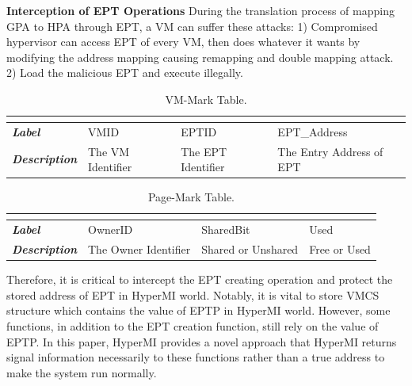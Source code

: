 \documentclass[conference]{IEEEtran}
\begin{document}
\textbf{Interception of EPT Operations }
During the translation process of mapping GPA to HPA through EPT, a VM can suffer these attacks: 1) Compromised hypervisor can access EPT of every VM, then does whatever it wants by modifying the address mapping causing remapping and double mapping attack. 2) Load the malicious EPT and execute illegally.
\begin{table}[htbp]
\centering
\caption{VM-Mark Table.}\label{tab1}
\begin{tabular}{p{1.4cm}|p{1.2cm}|p{1.1cm}|p{1.7cm}}
\hline
\multicolumn{4}{c}{\bfseries\textbf\centering{VM-Mark Table}}\\
\hline
{\itshape\bfseries Label} & VMID & EPTID & EPT\_Address\\
\hline
{\itshape\bfseries Description} & { The VM Identifier} & The EPT Identifier & The Entry Address of EPT\\
\hline
\end{tabular}
\end{table}
\begin{table}
\centering
\caption{Page-Mark Table.}\label{tab2}
\begin{tabular}{p{1.2cm}|p{1.4cm}|p{1.2cm}|p{1.5cm}}
\hline
\multicolumn{4}{c}{\bfseries\textbf\centering{Page-Mark Table}}\\
\hline
{\itshape\bfseries Label} & OwnerID & SharedBit & Used \\
\hline
{\itshape\bfseries Description} & The Owner Identifier & Shared or Unshared & Free or Used \\
\hline
\end{tabular}
\end{table}
Therefore, it is critical to intercept the EPT creating operation and protect the stored address of EPT in HyperMI world. Notably, it is vital to store VMCS structure which contains the value of EPTP in HyperMI world. 
However, some functions, in addition to the EPT creation function, still rely on the value of EPTP. In this paper, HyperMI provides a novel approach that HyperMI returns signal information necessarily to these functions rather than a true address to make the system run normally. 
\end{document}

